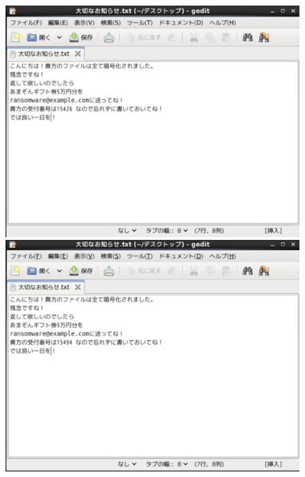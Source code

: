 \documentclass[dvipdfmx,autodetect-engine,titlepage]{jsarticle}
\begin{document}
\begin{figure}[h]
  \centering
  \begin{minipage}[b]{0.45\linewidth}
  \begin{center}
    \includegraphics[keepaspectratio,scale=0.35]{pic3.png}
    \end{center}
    \caption{}
  \end{minipage}
  \begin{minipage}[b]{0.45\linewidth}
  \begin{center}
    \includegraphics[keepaspectratio,scale=0.35]{pic4.png}
    \end{center}
    \caption{}
  \end{minipage}
\end{figure}
\end{document}
